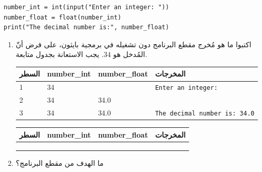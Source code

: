 \documentclass[14pt]{extarticle}
\begin{document}
\begin{enumerate}[label=\textbf{تمرين \arabic*:}, wide=0pt, itemsep=2.2em]
\begin{boxCode}
\begin{english}
\begin{verbatim}
number_int = int(input("Enter an integer: "))
number_float = float(number_int)
print("The decimal number is:", number_float)
\end{verbatim}
\end{english}
\end{boxCode}

\begin{enumerate}[label=\alph*.]
\item اكتبوا ما هو مُخرج مقطع البرنامج دون تشغيله في برمجية بايثون، على فرض أنّ المُدخل هو $34$. يجب الاستعانة بجدول متابعة.

\ifwithsols
\begin{boxSolution}
\begin{center}
\begin{english}
\renewcommand{\arraystretch}{1.4}
\begin{tabular}{|C{1.2cm}|C{2.4cm}|C{2.8cm}|C{3.8cm}|}
\hline
\textarabic{\textbf{السطر}} & \textbf{\small number\_int} & \textbf{\small number\_float} & \textarabic{\textbf{المخرجات}} \\
 & 34 & & \small\texttt{Enter an integer:} \\  & 34 & 34.0 & \\  & 34 & 34.0 & \small\texttt{The decimal number is: 34.0} \\ \hline
\end{tabular}
\end{english}
\end{center}
\end{boxSolution}
\else
\begin{center}
\begin{english}
\renewcommand{\arraystretch}{1.4}
\begin{tabular}{|C{1.2cm}|C{2.4cm}|C{2.8cm}|C{3.8cm}|}
\hline
\textarabic{\textbf{السطر}} & \textbf{\small number\_int} & \textbf{\small number\_float} & \textarabic{\textbf{المخرجات}} \\
\hline
 & & & \\ \hline
 & & & \\ \hline
 & & & \\ \hline
\end{tabular}
\end{english}
\end{center}
\fi
\filbreak

\item ما الهدف من مقطع البرنامج؟


\end{enumerate}
\end{enumerate}
\end{document}
